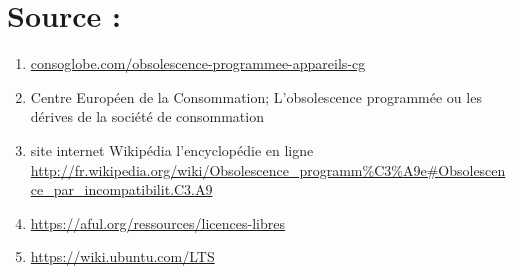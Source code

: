 \documentclass[10pt]{../fiche}
\begin{document}
\section*{Source :}
\begin{enumerate}
\item \url{consoglobe.com/obsolescence-programmee-appareils-cg}

\item Centre Européen de la Consommation;
\textsf{L'obsolescence programmée ou les dérives de la société de consommation}

\item site internet Wikipédia l’encyclopédie en ligne
\url{http://fr.wikipedia.org/wiki/Obsolescence_programm\%C3\%A9e#Obsolescence_par_incompatibilit.C3.A9}

\item \url{https://aful.org/ressources/licences-libres}

\item \url{https://wiki.ubuntu.com/LTS}
\end{enumerate}
\end{document}
